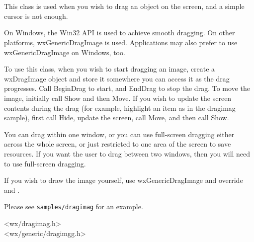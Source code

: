 \section{}\label{wxdragimage}

This class is used when you wish to drag an object on the screen,
and a simple cursor is not enough.

On Windows, the Win32 API is used to achieve smooth dragging. On other platforms,
wxGenericDragImage is used. Applications may also prefer to use
wxGenericDragImage on Windows, too.


To use this class, when you wish to start dragging an image, create a wxDragImage
object and store it somewhere you can access it as the drag progresses.
Call BeginDrag to start, and EndDrag to stop the drag. To move the image,
initially call Show and then Move. If you wish to update the screen contents
during the drag (for example, highlight an item as in the dragimag sample), first call Hide,
update the screen, call Move, and then call Show.

You can drag within one window, or you can use full-screen dragging
either across the whole screen, or just restricted to one area
of the screen to save resources. If you want the user to drag between
two windows, then you will need to use full-screen dragging.

If you wish to draw the image yourself, use wxGenericDragImage and
override  and 
.

Please see {\tt samples/dragimag} for an example.

%




<wx/dragimag.h>\\
<wx/generic/dragimgg.h>

